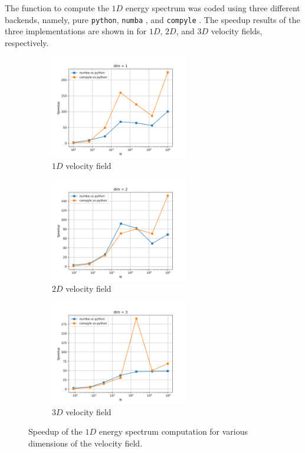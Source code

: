 The function to compute the $1D$ energy spectrum was coded using three different backends, namely, pure \texttt{python}, \texttt{numba} \parencite{Lam_Pitrou_Seibert_2015}, and \texttt{compyle} \parencite{compyle_pr_ab-proc-scipy-2020}.
The speedup results of the three implementations are shown in  for $1D$, $2D$, and $3D$ velocity fields, respectively.

\begin{figure}[htbp!]
    \begin{subfigure}{7cm}
      \centering\includegraphics[width=6cm]{Code-Figures/espec_speedup_dim_1.png}
      \caption{$1D$ velocity field}
    \end{subfigure}
    \begin{subfigure}{7cm}
      \centering\includegraphics[width=6cm]{Code-Figures/espec_speedup_dim_2.png}
      \caption{$2D$ velocity field}
    \end{subfigure}
    \begin{subfigure}{7cm}
      \centering\includegraphics[width=6cm]{Code-Figures/espec_speedup_dim_3.png}
      \caption{$3D$ velocity field}
    \end{subfigure}
    \caption{Speedup of the $1D$ energy spectrum computation for various dimensions of the velocity field.}
    \label{fig:espec-speedup}
\end{figure}

